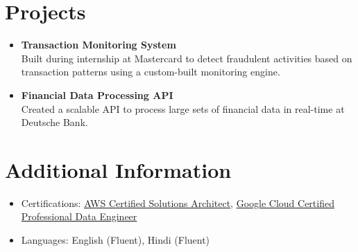 \documentclass[a4paper,10pt]{article} %
\begin{document}
\vspace{0.3em} %

\section*{Projects}
\begin{itemize}[leftmargin=0.3in, itemsep=3pt, topsep=2pt]
    \item \textbf{Transaction Monitoring System} \\
    Built during internship at Mastercard to detect fraudulent activities based on transaction patterns using a custom-built monitoring engine.

    \item \textbf{Financial Data Processing API} \\
    Created a scalable API to process large sets of financial data in real-time at Deutsche Bank.
\end{itemize}

\vspace{0.3em} %

\section*{Additional Information}
\begin{itemize}[leftmargin=0.3in, itemsep=3pt, topsep=2pt]
    \item Certifications: \href{https://aws.amazon.com/certification/certified-solutions-architect-associate/}{AWS Certified Solutions Architect}, \href{https://cloud.google.com/certification/data-engineer}{Google Cloud Certified Professional Data Engineer}
    \item Languages: English (Fluent), Hindi (Fluent)
\end{itemize}
\end{document}
